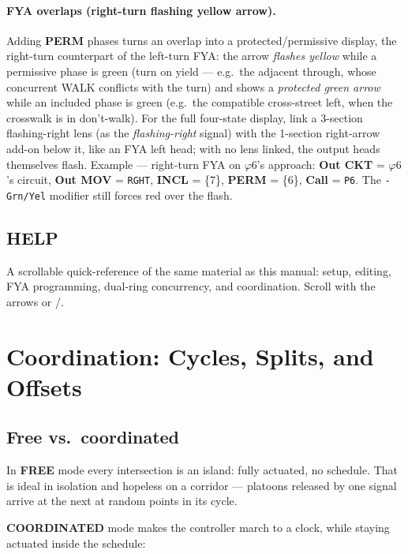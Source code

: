 \documentclass[11pt]{article}
\newcommand{\ph}[1]{\ensuremath{\varphi#1}}
\newcommand{\field}[1]{\textsf{\textbf{#1}}}
\newcommand{\key}[1]{\fcolorbox{inkhead}{gray!12}{\small\textsf{#1}}}
\begin{document}
\paragraph{FYA overlaps (right-turn flashing yellow arrow).} Adding \field{PERM}
phases turns an overlap into a protected/permissive display, the right-turn
counterpart of the left-turn FYA: the arrow \emph{flashes yellow} while a
permissive phase is green (turn on yield — e.g.\ the adjacent through, whose
concurrent WALK conflicts with the turn) and shows a \emph{protected green arrow}
while an included phase is green (e.g.\ the compatible cross-street left, when the
crosswalk is in don't-walk). For the full four-state display, link a 3-section
flashing-right lens (as the \emph{flashing-right} signal) with the 1-section
right-arrow add-on below it, like an FYA left head; with no lens linked, the
output heads themselves flash. Example — right-turn FYA on \ph{6}'s approach:
\field{Out CKT} = \ph{6}'s circuit, \field{Out MOV} = \texttt{RGHT},
\field{INCL} = \{7\}, \field{PERM} = \{6\}, \field{Call} = \texttt{P6}. The
\texttt{-Grn/Yel} modifier still forces red over the flash.

\subsection{HELP}

A scrollable quick-reference of the same material as this manual: setup, editing,
FYA programming, dual-ring concurrency, and coordination. Scroll with the arrows or
\key{+}/\key{−}.

\section{Coordination: Cycles, Splits, and Offsets}\label{sec:coord}

\subsection{Free vs.\ coordinated}

In \textbf{FREE} mode every intersection is an island: fully actuated, no schedule.
That is ideal in isolation and hopeless on a corridor — platoons released by one
signal arrive at the next at random points in its cycle.

\textbf{COORDINATED} mode makes the controller march to a clock, while staying
actuated inside the schedule:
\end{document}
